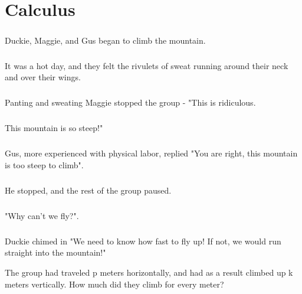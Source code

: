 \chapter{Calculus}

{ \paragraph{} Duckie, Maggie, and Gus began to climb the mountain. 
	\paragraph{} It was a hot day, and they felt the rivulets of sweat running around their neck and over their wings. 
	\paragraph{} Panting and sweating Maggie stopped the group - "This is ridiculous. \paragraph{} This mountain is so steep!"
	\paragraph{} Gus, more experienced with physical labor, replied "You are right, this mountain is too steep to climb".
	\paragraph{} He stopped, and the rest of the group paused. 
	\paragraph{} "Why can't we fly?".
	\paragraph{} Duckie chimed in "We need to know how fast to fly up! If not, we would run straight into the mountain!"
	
	The group had traveled p meters horizontally, and had as a result climbed up k meters vertically. How much did they climb for every meter?
}
{
}
{
}
{}
